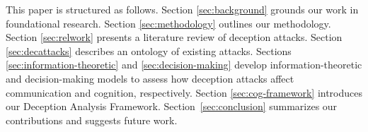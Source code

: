 This paper is structured as follows. 
Section \ref{sec:background} grounds our work in foundational research. 
Section \ref{sec:methodology} outlines our methodology. 
Section \ref{sec:relwork} presents a literature review of \MR deception attacks. %
Section \ref{sec:decattacks} describes an ontology of existing attacks. %
Sections \ref{sec:information-theoretic} and \ref{sec:decision-making} develop information-theoretic and decision-making models to assess how \MR deception attacks affect communication and cognition, respectively. 
Section \ref{sec:cog-framework} introduces our \MR Deception Analysis Framework. %
Section~\ref{sec:conclusion} summarizes our contributions and suggests future work.
